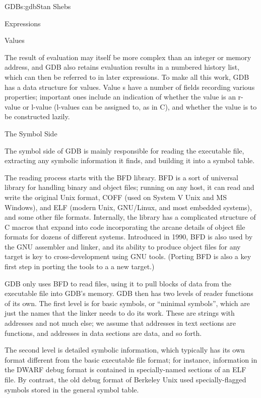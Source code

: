 \begin{aosachapter}{GDB}{s:gdb}{Stan Shebs}
\begin{aosasect2}{Expressions}
\end{aosasect2}

\begin{aosasect2}{Values}

The result of evaluation may itself be more complex than an integer or
memory address, and GDB also retains evaluation results in a numbered
history list, which can then be referred to in later expressions.  To
make all this work, GDB has a data structure for values.  Value
s have a number of fields recording various properties;
important ones include an indication of whether the value is an
r-value or l-value (l-values can be assigned to, as in C), and whether
the value is to be constructed lazily.

\end{aosasect2}

\begin{aosasect1}{The Symbol Side}

The symbol side of GDB is mainly responsible for reading the
executable file, extracting any symbolic information it finds, and
building it into a symbol table.

The reading process starts with the BFD library.  BFD is a sort of
universal library for handling binary and object files; running on any
host, it can read and write the original Unix  format,
COFF (used on System V Unix and MS Windows), and ELF (modern Unix,
GNU/Linux, and most embedded systems), and some other file formats.
Internally, the library has a complicated structure of C macros that
expand into code incorporating the arcane details of object file
formats for dozens of different systems.  Introduced in 1990, BFD is
also used by the GNU assembler and linker, and its ability to produce
object files for any target is key to cross-development using GNU
tools.  (Porting BFD is also a key first step in porting the tools to a
a new target.)

GDB only uses BFD to read files, using it to pull blocks of data
from the executable file into GDB's memory. GDB then has two levels of
reader functions of its own. The first level is for basic symbols, or
``minimal symbols'', which are just the names that the linker needs to
do its work. These are strings with addresses and not much else; we
assume that addresses in text sections are functions, and addresses
in data sections are data, and so forth.

The second level is detailed symbolic information, which typically has
its own format different from the basic executable file format; for
instance, information in the DWARF debug format is contained in
specially-named sections of an ELF file.  By contrast, the old
 debug format of Berkeley Unix used specially-flagged
symbols stored in the general symbol table.


\end{aosasect1}
\end{aosachapter}
